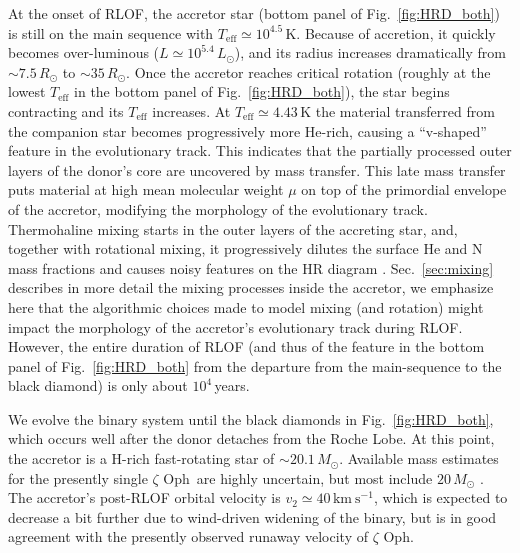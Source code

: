 \documentclass[twocolumn,twocolappendix,trackchanges]{aastex63}
\newcommand{\kms}{{\mathrm{km\ s^{-1}}}}
\DeclareRobustCommand{\Figref}[1]{Fig.~\ref{#1}}
\DeclareRobustCommand{\Secref}[1]{Sec.~\ref{#1}}
\newcommand{\zoph}{$\zeta$ Oph}
\begin{document}
At the onset of RLOF, the accretor star (bottom panel of
\Figref{fig:HRD_both}) is still on the main sequence with
$T_\mathrm{eff}\simeq10^{4.5}$\,K. Because of accretion,
it quickly becomes over-luminous ($L\simeq10^{5.4}\,L_\odot$), and its
radius increases dramatically from $\sim7.5\,R_\odot$ to
$\sim35\,R_\odot$. Once the accretor reaches critical rotation
(roughly at the lowest $T_\mathrm{eff}$ in the bottom panel of
\Figref{fig:HRD_both}), the star begins contracting and its
$T_\mathrm{eff}$ increases. At $T_\mathrm{eff}\simeq 4.{43}$\,K the
material transferred from the companion star becomes progressively
more He-rich, causing a ``v-shaped'' feature in the evolutionary
track. This indicates that the partially processed outer layers of the donor's core are
uncovered by mass transfer. %
This late mass transfer puts material at high mean molecular weight
$\mu$ on top of the primordial envelope of the accretor, modifying the morphology of the evolutionary track. Thermohaline mixing starts in the outer layers of the accreting star, and, together with rotational mixing, it progressively dilutes the surface He and N mass fractions and causes noisy features on the HR diagram \citep[e.g.,][]{cantiello:07}. \Secref{sec:mixing} describes in more detail the mixing processes inside the accretor, we emphasize here that the algorithmic choices made to model mixing (and rotation) might impact the morphology of the accretor's evolutionary track during RLOF. However, the entire duration of RLOF (and thus of the feature in the bottom panel of \Figref{fig:HRD_both} from the departure from the main-sequence to the black diamond) is only about
$10^4$\,years.

We evolve the binary system until the black diamonds in
\Figref{fig:HRD_both}, which occurs well after the donor detaches from
the Roche Lobe. At this point, the accretor is a H-rich fast-rotating
star of
$\sim$$20.1\,M_\odot$. Available mass estimates for the presently single \zoph\ are highly uncertain, but most include
$20\,M_\odot$ \citep[e.g.,][]{hoogerwerf:01, villamariz:05, neuhauser:20}. The accretor's post-RLOF orbital velocity is
$v_2\simeq40\,\kms$, which is expected to decrease a bit further due to wind-driven widening of the binary, but is in good agreement with the presently observed runaway velocity of \zoph.
\end{document}
